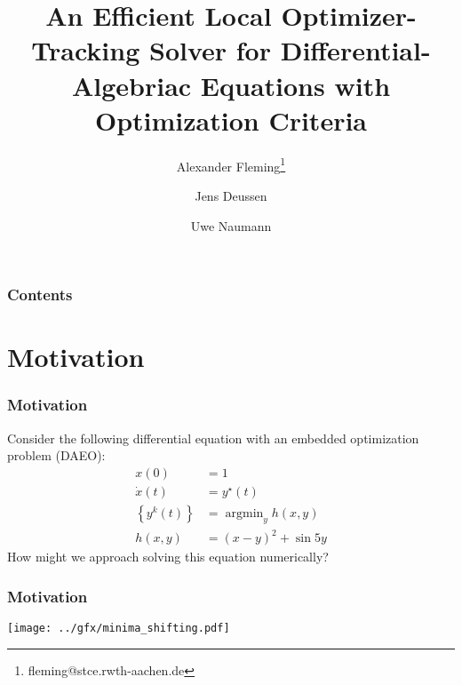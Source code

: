 \documentclass[10pt]{beamer}
\DeclareMathOperator*{\argmin}{\arg\min}
\begin{document}
\title[AD2024, Chicago, Sep 16-19, 2024]{{\bf An Efficient Local Optimizer-Tracking Solver for Differential-Algebriac Equations with Optimization Criteria}}
\author[]{Alexander Fleming\footnote{\scriptsize fleming@stce.rwth-aachen.de} \and Jens Deussen \and Uwe Naumann}
		
\begin{frame}[plain]
\titlepage
\end{frame}

\begin{frame}
	\frametitle{Contents}
	\tableofcontents
\end{frame}

\section{Motivation}

\begin{frame}
\frametitle{Motivation}
\vfill
	Consider the following differential equation with an embedded optimization problem (DAEO):
\begin{equation}
	\label{eq:complicated-example}
	\begin{aligned}
		x(0) &= 1\\
		\dot x(t) &= y^\star(t)\\
		\left\{y^k(t)\right\} &= \argmin_{y} h(x, y)\\
		h(x, y) &= (x-y)^2 + \sin 5y
	\end{aligned}
\end{equation}
\vfill
How might we approach solving this equation numerically?
\vfill
\end{frame}

\begin{frame}
	\frametitle{Motivation}
	\begin{center}
		\texttt{[image: ../gfx/minima\_shifting.pdf]}
	\end{center}
\end{frame}
\end{document}
